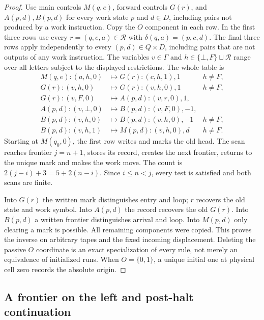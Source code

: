 \begin{proof}\label{proof:bb-mid-mark-compiler}
Use main controls $M(q,e)$, forward controls $G(r)$, and $A(p,d),B(p,d)$
for every work state $p$ and $d\in D$, including pairs not produced by
a work instruction. Copy the $O$ component in each row. In the first
three rows use every $r=(q,e,a)\in\mathcal R$ with
$\delta(q,a)=(p,c,d)$. The final three rows apply independently to
every $(p,d)\in Q\times D$, including pairs that are not outputs of
any work instruction. The variables $v\in\Gamma$ and
$h\in\{\bot,F\}\sqcup\mathcal R$ range over all letters subject to
the displayed restrictions. The whole table is
\[
\begin{array}{lll}
 M(q,e):(a,h,0)&\mapsto G(r):(c,h,1),1&h\ne F,\\
 G(r):(v,h,0)&\mapsto G(r):(v,h,0),1&h\ne F,\\
 G(r):(v,F,0)&\mapsto A(p,d):(v,r,0),1,&\\
 A(p,d):(v,\bot,0)&\mapsto B(p,d):(v,F,0),-1,&\\
 B(p,d):(v,h,0)&\mapsto B(p,d):(v,h,0),-1&h\ne F,\\
 B(p,d):(v,h,1)&\mapsto M(p,d):(v,h,0),d&h\ne F.
\end{array}
\]
Starting at $M(q_0,0)$, the first row writes and marks the old head.
The scan reaches frontier $j=n+1$, stores its record, creates the
next frontier, returns to the unique mark and makes the work move.
The count is $2(j-i)+3=5+2(n-i)$.  Since $i\le n<j$, every test is
satisfied and both scans are finite.

Into $G(r)$ the written mark distinguishes entry and loop; $r$
recovers the old state and work symbol.  Into $A(p,d)$ the record
recovers the old $G(r)$.  Into $B(p,d)$ a written frontier distinguishes
arrival and loop.  Into $M(p,d)$ only clearing a mark is possible.
All remaining components were copied.  This proves the inverse on
arbitrary tapes and the fixed incoming displacement.  Deleting the
passive $O$ coordinate is an exact specialization of every rule,
not merely an equivalence of initialized runs.  When $O=\{0,1\}$,
a unique initial one at physical cell zero records the absolute origin.
\end{proof}

\subsection{A frontier on the left and post-halt continuation}

